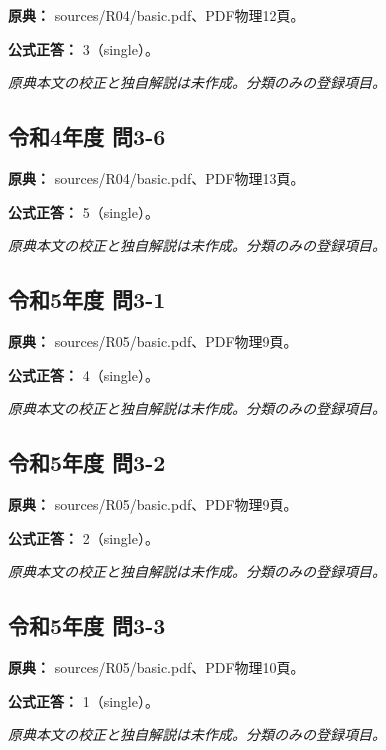 \noindent\textbf{原典：} sources/R04/basic.pdf、PDF物理12頁。

\textbf{公式正答：} 3（single）。

\par\textit{原典本文の校正と独自解説は未作成。分類のみの登録項目。}

\subsection{令和4年度 問3-6}
\label{q:r04-reg-basic-3-6}

\noindent\textbf{原典：} sources/R04/basic.pdf、PDF物理13頁。

\textbf{公式正答：} 5（single）。

\par\textit{原典本文の校正と独自解説は未作成。分類のみの登録項目。}

\subsection{令和5年度 問3-1}
\label{q:r05-reg-basic-3-1}

\noindent\textbf{原典：} sources/R05/basic.pdf、PDF物理9頁。

\textbf{公式正答：} 4（single）。

\par\textit{原典本文の校正と独自解説は未作成。分類のみの登録項目。}

\subsection{令和5年度 問3-2}
\label{q:r05-reg-basic-3-2}

\noindent\textbf{原典：} sources/R05/basic.pdf、PDF物理9頁。

\textbf{公式正答：} 2（single）。

\par\textit{原典本文の校正と独自解説は未作成。分類のみの登録項目。}

\subsection{令和5年度 問3-3}
\label{q:r05-reg-basic-3-3}

\noindent\textbf{原典：} sources/R05/basic.pdf、PDF物理10頁。

\textbf{公式正答：} 1（single）。

\par\textit{原典本文の校正と独自解説は未作成。分類のみの登録項目。}

